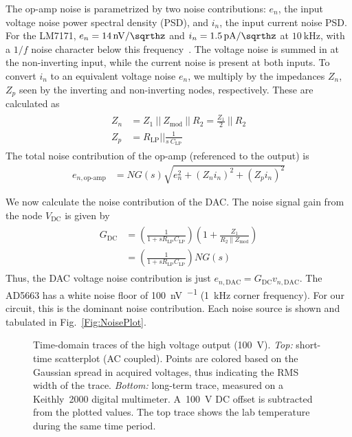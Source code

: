 \documentclass[aip,rsi,preprint,graphicx]{revtex4-1} %
\newcommand{\epar}{~||~} %
\begin{document}
The op-amp noise is parametrized by two noise contributions: $e_n$, the input voltage noise power spectral density (PSD), and $i_n$, the input current noise PSD.
For the LM7171, $e_n = \SI[per-mode=symbol]{14}{\nano\volt\per\sqrthz}$ and $i_n = \SI[per-mode=symbol]{1.5}{\pico\ampere\per\sqrthz}$ at $\SI{10}{\kilo\hertz}$, with a $1/f$ noise character below this frequency~\cite{LM7171Datasheet}.
The voltage noise is summed in at the non-inverting input, while the current noise is present at both inputs.
To convert $i_n$ to an equivalent voltage noise $e_n$, we multiply by the impedances $Z_n$, $Z_p$ seen by the inverting and non-inverting nodes, respectively.
These are calculated as
\begin{align}
\begin{split}
\label{Eq:ZnZp}
Z_n &= Z_1 \epar Z_{\text{mod}} \epar  R_2   = \frac{Z_1}{2} \epar R_2 \\
Z_p &= R_{\text{LP}}  \big|\big|\frac{1}{s~C_{\text{LP}}}
\end{split}
\end{align}
The total noise contribution of the op-amp (referenced to the output) is
\begin{align}
\label{Eq:OpAmpNoise}
e_{n,\text{op-amp}} &= NG(s)\sqrt{e_n^2 + (Z_n i_n)^2 + (Z_p i_n)^2}
\end{align}

We now calculate the noise contribution of the DAC.
The noise signal gain from the node $V_{\text{DC}}$ is given by
\begin{align}
\begin{split}
\label{Eq:Gdc}
G_{\text{DC}} &= \left(\frac{1}{1+sR_{\text{LP}}C_{\text{LP}}}\right)\left(1+\frac{Z_1}{R_2\epar Z_{\text{mod}}}\right) \\
&= \left(\frac{1}{1+sR_{\text{LP}}C_{\text{LP}}}\right)NG(s)
\end{split}
\end{align}
Thus, the DAC voltage noise contribution is just $e_{n,\text{DAC}} = G_{\text{DC}} v_{n,\text{DAC}}$. The AD5663 has a white noise floor of \SI[per-mode=symbol]{100}{\nano\volt\per\sqrthz} (\SI{1}{\kilo\hertz} corner frequency).
For our circuit, this is the dominant noise contribution.
Each noise source is shown and tabulated in Fig.~\ref{Fig:NoisePlot}.


\begin{figure}[h]
\subfloat{
}

\caption{Time-domain traces of the high voltage output (\SI{100}{\volt}). \textit{Top:} short-time scatterplot  (AC coupled). Points are colored based on the Gaussian spread in acquired voltages, thus indicating the RMS width of the trace. \textit{Bottom:} long-term trace, measured on a Keithly~2000 digital multimeter. A~\SI{100}{\volt} DC offset is subtracted from the plotted values. The top trace shows the lab temperature during the same time period.\label{Fig:TimeDomain}}
\end{figure}
\end{document}
